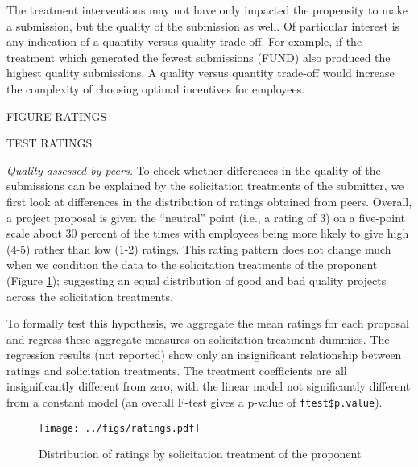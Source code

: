 \documentclass[12pt, titlepage]{article}
\begin{document}
The treatment interventions may not have only impacted the propensity to
make a submission, but the quality of the submission as well. Of
particular interest is any indication of a quantity versus quality
trade-off. For example, if the treatment which generated the fewest
submissions (FUND) also produced the highest quality submissions. A
quality versus quantity trade-off would increase the complexity of
choosing optimal incentives for employees.

FIGURE RATINGS

TEST RATINGS

\emph{Quality assessed by peers.} To check whether differences in the
quality of the submissions can be explained by the solicitation
treatments of the submitter, we first look at differences in the
distribution of ratings obtained from peers. Overall, a project proposal
is given the ``neutral'' point (i.e., a rating of 3) on a five-point
scale about 30 percent of the times with employees being more likely to
give high (4-5) rather than low (1-2) ratings. This rating pattern does
not change much when we condition the data to the solicitation
treatments of the proponent (Figure \ref{ratings}); suggesting an equal
distribution of good and bad quality projects across the solicitation
treatments.

To formally test this hypothesis, we aggregate the mean ratings for each
proposal and regress these aggregate measures on solicitation treatment
dummies. The regression results (not reported) show only an
insignificant relationship between ratings and solicitation treatments.
The treatment coefficients are all insignificantly different from zero,
with the linear model not significantly different from a constant model
(an overall F-test gives a p-value of \texttt{ftest\$p.value}).

\begin{figure}
  \centering
  \caption{Distribution of ratings by solicitation treatment of the proponent}
  \label{ratings}
  \texttt{[image: ../figs/ratings.pdf]}
\end{figure}
\end{document}
